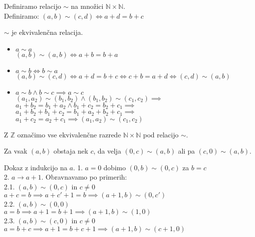 \begin{definicija}
    Definiramo relacijo $\sim$ na množici $\mathbb{N} \times \mathbb{N}$. \\
    Definiramo: $(a, b) \sim (c, d) \iff a + d = b + c$
\end{definicija}

\begin{trditev}
    $\sim$ je ekvivalenčna relacija.
\end{trditev}
\begin{dokaz}
    \begin{itemize}
        \item $a \sim a$ \\
        $(a, b) \sim (a, b) \iff a + b = b + a$
        \item $a \sim b \iff b \sim a$ \\
        $(a, b) \sim (c, d) \iff a + d = b + c \iff c + b = a + d \iff (c, d) \sim (a, b)$
        \item $a \sim b \wedge b \sim c \implies a \sim c$ \\
        $(a_1, a_2) \sim (b_1, b_2) \wedge (b_1, b_2) \sim (c_1, c_2) \implies$ \\
        $a_1 + b_2 = b_1 + a_2 \wedge b_1 + c_2 = b_2 + c_1 \implies$ \\
        $a_1 + b_2 + b_1 + c_2 = b_1 + a_2 + b_2 + c_1 \implies$ \\
        $a_1 + c_2 = a_2 + c_1 \implies (a_1, a_2) \sim (c_1, c_2)$
    \end{itemize}
\end{dokaz}

\begin{definicija}
    Z $\mathbb{Z}$ označimo vse ekvivalenčne razrede $\mathbb{N} \times \mathbb{N}$ pod relacijo $\sim$.
\end{definicija}

\begin{trditev}
    Za vsak $(a, b)$ obstaja nek $c$, da velja $(0, c) \sim (a, b)$ ali pa $(c, 0) \sim (a, b)$.
\end{trditev}
\begin{dokaz}
    Dokaz z indukcijo na $a$.
    1. $a = 0$ dobimo $(0, b) \sim (0, c)$ za $b = c$ \\
    2. $a \to a + 1$.
    Obravnavamo po primerih: \\
    2.1. $(a, b) \sim (0, c)$ in $c \neq 0$ \\
    $a + c = b \implies a + c' + 1 = b \implies (a + 1, b) \sim (0, c')$ \\
    2.2. $(a, b) \sim (0, 0)$ \\
    $a = b \implies a + 1 = b + 1 \implies (a + 1, b) \sim (1, 0)$ \\
    2.3. $(a, b) \sim (c, 0)$ in $c \neq 0$ \\
    $a = b + c \implies a + 1 = b + c + 1 \implies (a + 1, b) \sim (c + 1, 0)$
\end{dokaz}

